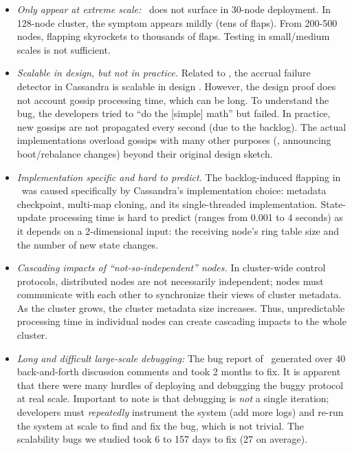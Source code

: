 \begin{itemize}
\item {\em Only appear at extreme scale:} \caone\ does not surface in 30-node
deployment. In 128-node cluster, the symptom appears mildly (tens of flaps).
From 200-500 nodes, flapping skyrockets to thousands of flaps. Testing in
small/medium scales is not sufficient.

\item {\em Scalable in design, but not in practice.}  Related to \caone, the
accrual failure detector \cite{Hayashibara+04-PhiFailureDetector} in
Cassandra is scalable in design \cite{Lakshman+09-Cassandra}.  However, the
design proof does not account gossip processing time, which can be long. To
understand the bug, the developers tried to ``do the [simple] math''
\cite{CA-One} but failed. In practice, new gossips are not propagated every
second (due to the backlog). The actual implementations overload gossips with
many other purposes (\eg, announcing boot/rebalance changes) beyond their
original design sketch.


\item {\em Implementation specific and hard to predict.}  The
backlog-induced flapping in \caone\ was caused specifically by Cassandra's
implementation choice: metadata checkpoint, multi-map cloning, and its
single-threaded implementation.  State-update processing time is hard to
predict (ranges from 0.001 to 4 seconds) as it depends on a 2-dimensional
input: the receiving node's ring table size and the number of new
state changes.

\item {\em Cascading impacts of ``not-so-independent'' nodes.}  In
cluster-wide control protocols, distributed nodes are  not
necessarily independent; nodes must communicate with each other
to synchronize their views of cluster metadata.  As the cluster grows, the
cluster metadata size increases.  Thus, unpredictable processing time in
individual nodes can create cascading impacts to the whole cluster.

% 
\item {\em Long and difficult large-scale debugging:}
%
The bug report of \caone\ generated over 40 back-and-forth discussion
comments and took 2 months to fix.  It is apparent \cite{CA-One} that
there were many hurdles of deploying and debugging the buggy protocol at
real scale.  Important to note is that debugging is {\em not} a single
iteration; developers must {\em repeatedly} instrument the system (add
more logs) and re-run the system at scale to find and fix the bug, which
is not trivial.  The scalability bugs we studied took 6 to 157 days to
fix (27 on average).


\end{itemize}
